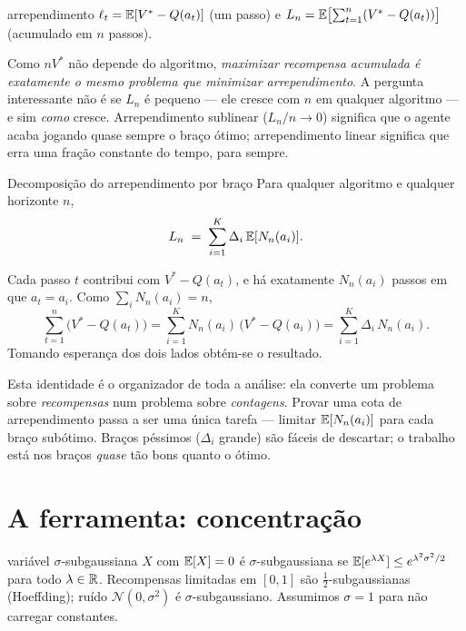 \documentclass[11pt]{article}
\begin{document}
\begin{defbox}{arrependimento}
$\ell_t = \mathbb{E}[V^{*} - Q(a_t)]$ (um passo) e
$L_n = \mathbb{E}\bigl[\sum_{t=1}^{n}(V^{*}-Q(a_t))\bigr]$ (acumulado em $n$ passos).
\end{defbox}

Como $nV^{*}$ não depende do algoritmo, \emph{maximizar recompensa acumulada é
exatamente o mesmo problema que minimizar arrependimento}. A pergunta
interessante não é se $L_n$ é pequeno --- ele cresce com $n$ em qualquer
algoritmo --- e sim \emph{como} cresce. Arrependimento sublinear ($L_n/n\to0$)
significa que o agente acaba jogando quase sempre o braço ótimo; arrependimento
linear significa que erra uma fração constante do tempo, para sempre.

\begin{teobox}{Decomposição do arrependimento por braço}
Para qualquer algoritmo e qualquer horizonte $n$,
\[
  L_n \;=\; \sum_{i=1}^{K} \Delta_i\,\mathbb{E}[N_n(a_i)].
\]
\end{teobox}

\begin{provabox}
Cada passo $t$ contribui com $V^{*}-Q(a_t)$, e há exatamente $N_n(a_i)$ passos
em que $a_t = a_i$. Como $\sum_i N_n(a_i) = n$,
\[
  \sum_{t=1}^{n}\bigl(V^{*}-Q(a_t)\bigr)
  = \sum_{i=1}^{K} N_n(a_i)\,\bigl(V^{*}-Q(a_i)\bigr)
  = \sum_{i=1}^{K} \Delta_i\, N_n(a_i).
\]
Tomando esperança dos dois lados obtém-se o resultado.
\end{provabox}

\begin{ideiabox}
Esta identidade é o organizador de toda a análise: ela converte um problema
sobre \emph{recompensas} num problema sobre \emph{contagens}. Provar uma cota
de arrependimento passa a ser uma única tarefa --- limitar $\mathbb{E}[N_n(a_i)]$ para
cada braço subótimo. Braços péssimos ($\Delta_i$ grande) são fáceis de
descartar; o trabalho está nos braços \emph{quase} tão bons quanto o ótimo.
\end{ideiabox}

\section{A ferramenta: concentração}

\begin{defbox}{variável $\sigma$-subgaussiana}
$X$ com $\mathbb{E}[X]=0$ é $\sigma$-subgaussiana se
$\mathbb{E}[e^{\lambda X}] \le e^{\lambda^{2}\sigma^{2}/2}$ para todo $\lambda\in\mathbb{R}$.
Recompensas limitadas em $[0,1]$ são $\tfrac12$-subgaussianas (Hoeffding);
ruído $\mathcal{N}(0,\sigma^2)$ é $\sigma$-subgaussiano. Assumimos $\sigma=1$
para não carregar constantes.
\end{defbox}
\end{document}
